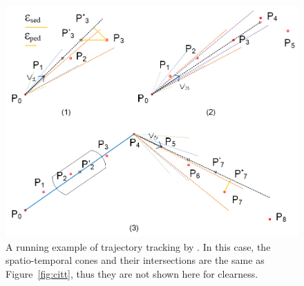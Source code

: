 \begin{figure}[tb!]
	\centering
	\includegraphics[scale=1.0]{figures/Fig-BITT.png}
	\vspace{-1ex}
	\caption{\small A running example of trajectory tracking by \bitt. In this case, the spatio-temporal cones and their intersections are the same as Figure~\ref{fig:citt}, thus they are not shown here for clearness.  }
	\vspace{-2ex}
	\label{fig:bitt}
\end{figure}



